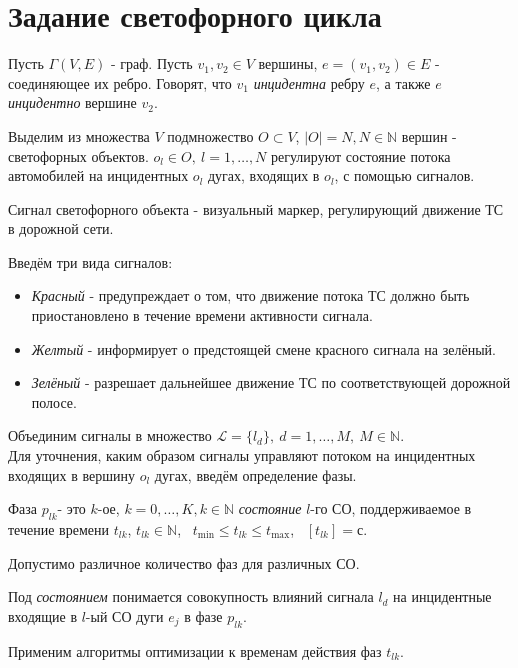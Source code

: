 \section{Задание светофорного цикла}
\begin{m-definition}\cite{book-Novikov}
	Пусть $\Gamma(V, E)$ - граф. Пусть $v_1, v_2 \in V$ вершины, $e = (v_1, v_2) \in E$ - соединяющее их ребро. Говорят, что $v_1$ \textit{инцидентна} ребру $e$, а также $e$ \textit{инцидентно} вершине $v_2$.
\end{m-definition}
Выделим из множества $V$ подмножество $O \subset V$, $|O| = N, N \in \mathbb{N}$ вершин - светофорных объектов. $o_l\in O, \ l = 1,\ldots, N$ регулируют состояние потока автомобилей на инцидентных $o_l$ дугах, входящих в $o_l$, с помощью сигналов.
\begin{m-definition}
		Сигнал светофорного объекта - визуальный маркер, регулирующий движение ТС в дорожной сети.
\end{m-definition}
Введём три вида сигналов:
\begin{itemize}
	\item \textit{Красный} - предупреждает о том, что движение потока ТС должно быть приостановлено в течение времени активности сигнала.
	\item \textit{Желтый} - информирует о предстоящей смене красного сигнала на зелёный.
	\item \textit{Зелёный} - разрешает дальнейшее движение ТС по соответствующей дорожной полосе.
\end{itemize}

Объединим сигналы в множество $\mathcal{L} = \{ l_d \}, \ d = 1, \ldots, M, \ M \in \mathbb{N}.$\\
Для уточнения, каким образом сигналы управляют потоком на инцидентных входящих в вершину $o_l$ дугах, введём определение фазы.
\begin{m-definition}
	Фаза $p_{lk}$- это $k$-ое, $ k = 0, \ldots, K, k \in \mathbb{N}$ \textit{состояние} $l$-го СО, поддерживаемое в течение времени $t_{lk}$, $t_{lk} \in \mathbb{N}$, \ $t_{\min} \leq t_{lk} \leq t_{\max}$, \ $[t_{lk}] = \text{с}$.
\end{m-definition}
Допустимо различное количество фаз для различных СО.
\begin{m-definition}
	Под \textit{состоянием} понимается совокупность влияний сигнала $l_d$ на инцидентные входящие в $l$-ый СО дуги $e_j$ в фазе $p_{lk}$.
\end{m-definition}
Применим алгоритмы оптимизации к временам действия фаз $t_{lk}$.\\
 
